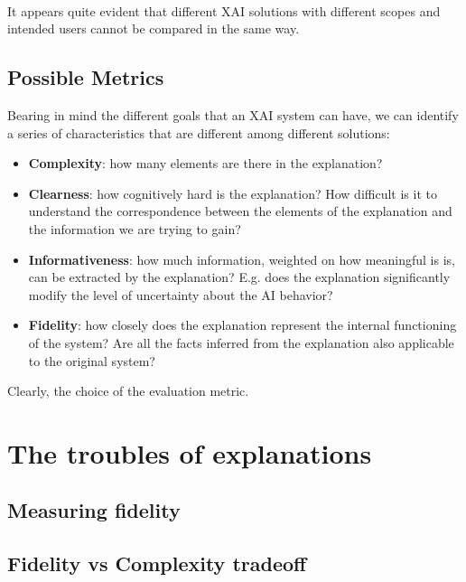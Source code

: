 \documentclass[conference]{IEEEtran}
\begin{document}
\

It appears quite evident that different XAI solutions with different scopes and
intended users cannot be compared in the same way.

\subsection{Possible Metrics}
\label{sec:dimensions}

Bearing in mind the different goals that an XAI system can have, we can identify
a series of characteristics that are different among different solutions:

\begin{itemize}
    \item \textbf{Complexity}: how many elements are there in the explanation?
    \item \textbf{Clearness}: how cognitively hard is the explanation? How
          difficult is it to understand the correspondence between the elements
          of the explanation and the information we are trying to gain?
    \item \textbf{Informativeness}: how much information, weighted on how
          meaningful is is, can be extracted by the explanation? E.g. does the
          explanation significantly modify the level of uncertainty about the AI
          behavior?
    \item \textbf{Fidelity}: how closely does the explanation represent the
          internal functioning of the system? Are all the facts inferred from
          the explanation also applicable to the original system?
\end{itemize}

Clearly, the choice of the evaluation metric.

\section{The troubles of explanations}
\label{sec:troubles}

\subsection{Measuring fidelity}
\label{sec:fidelity}

\subsection{Fidelity vs Complexity tradeoff}
\label{sec:tradeoff}
\end{document}
